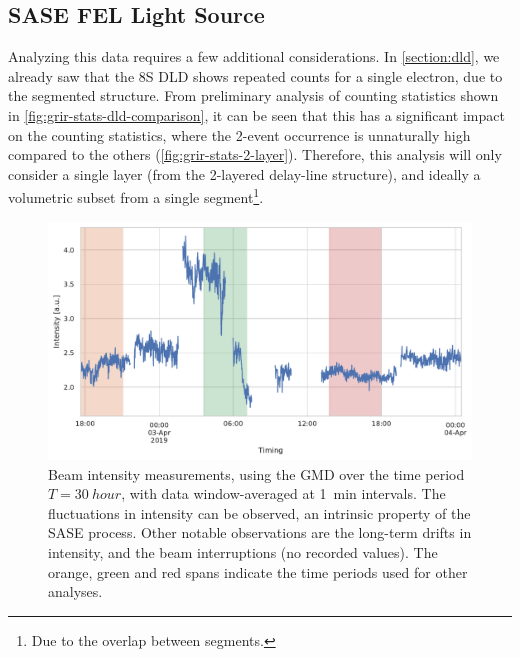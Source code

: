 \subsection*{SASE FEL Light Source}
Analyzing this data requires a few additional considerations. In \cref{section:dld}, we already saw that the \num{8}S \gls{DLD} shows repeated counts for a single electron, due to the segmented structure. From preliminary analysis of counting statistics shown in \cref{fig:grir-stats-dld-comparison}, it can be seen that this has a significant impact on the counting statistics, where the \num{2}-event occurrence is unnaturally high compared to the others (\cref{fig:grir-stats-2-layer}). Therefore, this analysis will only consider a single layer (from the 2-layered delay-line structure), and ideally a volumetric subset from a single segment\footnote{Due to the overlap between segments.}.



\begin{figure}
    \centering
    \includegraphics[width=0.8\linewidth]{images/gmd_grir.pdf}
    \caption{Beam intensity measurements, using the \gls{GMD} over the time period $T=\qty{30}{hour}$, with data window-averaged at \qty{1}{min} intervals. The fluctuations in intensity can be observed, an intrinsic property of the \gls{SASE} process. Other notable observations are the long-term drifts in intensity, and the beam interruptions (no recorded values). The orange, green and red spans indicate the time periods used for other analyses.}
    \label{fig:gmd-intensity}
\end{figure}


